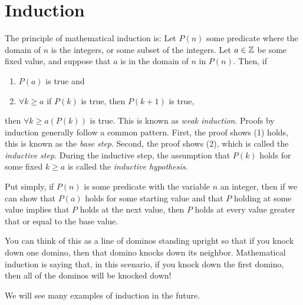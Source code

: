 \section{Induction}



The principle of mathematical induction is:
Let $P(n)$ some predicate where the domain of $n$ is the integers, or some subset of the integers.
Let $a\in\mathbb{Z}$ be some fixed value, and suppose that $a$ is in the domain of $n$ in $P(n)$.
Then, if
\begin{enumerate}
  \item $P(a)$ is true and
  \item $\forall k\geq a$ if $P(k)$ is true, then $P(k+1)$ is true,
\end{enumerate}
then $\forall k\geq a(P(k))$ is true.
This is known as \emph{weak induction}.
Proofs by induction generally follow a common pattern.
First, the proof shows (1) holds, this is known as the \emph{base step}.
Second, the proof shows (2), which is called the \emph{inductive step}.
During the inductive step, the assumption that $P(k)$ holds for some fixed $k\geq a$ is called the \emph{inductive hypothesis}.

Put simply, if $P(n)$ is some predicate with the variable $n$ an integer, then if we can show that $P(a)$ holds for some starting value and that $P$ holding at some value implies that $P$ holds at the next value, then $P$ holds at every value greater that or equal to the base value.

You can think of this as a line of dominos standing upright so that if you knock down one domino, then that domino knocks down its neighbor.
Mathematical induction is saying that, in this scenario, if you knock down the first domino, then all of the dominos will be knocked down!

We will see many examples of induction in the future.












